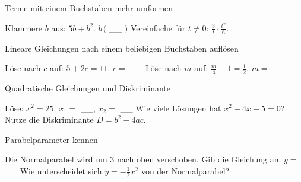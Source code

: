 \setcounter{aufgabe}{0}

\begin{aufgabe}{Terme mit einem Buchstaben mehr umformen}
\begin{teile}
\teil Klammere $b$ aus: $5b + b^2$. $b\,($ \_\_ $)$
\teil Vereinfache für $t \neq 0$: $\frac{3}{t} \cdot \frac{t^2}{6}$. \leerfeld
\end{teile}
\end{aufgabe}

\begin{aufgabe}{Lineare Gleichungen nach einem beliebigen Buchstaben auflösen}
\begin{teile}
\teil Löse nach $c$ auf: $5 + 2c = 11$. $c =$ \_\_
\teil Löse nach $m$ auf: $\frac{m}{4} - 1 = \frac{1}{2}$. $m =$ \_\_
\end{teile}
\end{aufgabe}

\begin{aufgabe}{Quadratische Gleichungen und Diskriminante}
\begin{teile}
\teil Löse: $x^2 = 25$. $x_1 =$ \_\_, $x_2 =$ \_\_
\teil Wie viele Lösungen hat $x^2 - 4x + 5 = 0$? Nutze die Diskriminante $D = b^2 - 4ac$.
\end{teile}
\end{aufgabe}

\begin{aufgabe}{Parabelparameter kennen}
\begin{teile}
\teil Die Normalparabel wird um 3 nach oben verschoben. Gib die Gleichung an. $y =$ \_\_
\teil Wie unterscheidet sich $y = -\frac{1}{2}x^2$ von der Normalparabel?
\end{teile}
\end{aufgabe}


